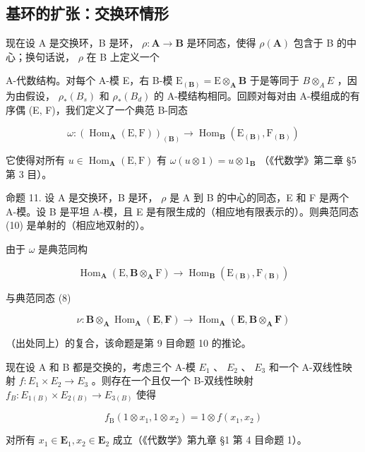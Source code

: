 \subsection{基环的扩张：交换环情形}

现在设 A 是交换环，B 是环， \(\rho: \mathbf{A} \to \mathbf{B}\) 是环同态，使得 \(\rho(\mathbf{A})\) 包含于 B 的中心；换句话说， \(\rho\) 在 B 上定义一个

A-代数结构。对每个 A-模 E，右 B-模 \(\mathrm{E}_{(\mathbf{B})} = \mathrm{E} \otimes_{\mathbf{A}} \mathbf{B}\) 于是等同于 \(B \otimes_{A} E\) ，因为由假设， \(\rho_{*}(B_{s})\) 和 \(\rho_{*}(B_{d})\) 的 A-模结构相同。回顾对每对由 A-模组成的有序偶 (E, F)，我们定义了一个典范 B-同态

\[
\omega : \left(\operatorname{Hom} _ {\mathbf {A}} (\mathrm{E}, \mathrm{F})\right) _ {(\mathbf {B})} \rightarrow \operatorname{Hom} _ {\mathbf {B}} \left(\mathrm{E} _ {(\mathbf {B})}, \mathrm{F} _ {(\mathbf {B})}\right)\tag{10}
\]

它使得对所有 \(u \in \operatorname{Hom}_{\mathbf{A}}(\mathrm{E}, \mathrm{F})\) 有 \(\omega(u \otimes 1) = u \otimes 1_{\mathbf{B}}\) （《代数学》第二章 §5 第 3 目）。

命题 11. 设 A 是交换环，B 是环， \(\rho\) 是 A 到 B 的中心的同态，E 和 F 是两个 A-模。设 B 是平坦 A-模，且 E 是有限生成的（相应地有限表示的）。则典范同态 (10) 是单射的（相应地双射的）。

由于 \(\omega\) 是典范同构

\[
\operatorname{Hom} _ {\mathbf {A}} (\mathrm{E}, \mathbf {B} \otimes_ {\mathbf {A}} \mathrm{F}) \rightarrow \operatorname{Hom} _ {\mathbf {B}} (\mathrm{E} _ {(\mathbf {B})}, \mathrm{F} _ {(\mathbf {B})})
\]

与典范同态 (8)

\[
\nu \colon \mathbf {B} \otimes_ {\mathbf {A}} \operatorname{Hom} _ {\mathbf {A}} (\mathbf {E}, \mathbf {F}) \rightarrow \operatorname{Hom} _ {\mathbf {A}} (\mathbf {E}, \mathbf {B} \otimes_ {\mathbf {A}} \mathbf {F})
\]

（出处同上）的复合，该命题是第 9 目命题 10 的推论。

现在设 A 和 B 都是交换的，考虑三个 A-模 \(E_{1}\) 、 \(E_{2}\) 、 \(E_{3}\) 和一个 A-双线性映射 \(f: E_{1} \times E_{2} \to E_{3}\) 。则存在一个且仅一个 B-双线性映射 \(f_{B}: E_{1(B)} \times E_{2(B)} \to E_{3(B)}\) 使得

\[
f _ {\mathrm{B}} (1 \otimes x _ {1}, 1 \otimes x _ {2}) = 1 \otimes f (x _ {1}, x _ {2})
\]

对所有 \(x_{1} \in \mathbf{E}_{1}, x_{2} \in \mathbf{E}_{2}\) 成立（《代数学》第九章 §1 第 4 目命题 1）。

